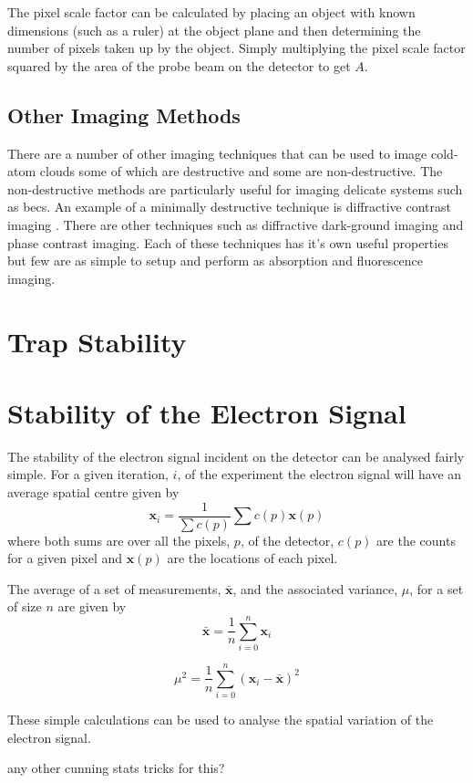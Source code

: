 The pixel scale factor can be calculated by placing an object with known dimensions (such as a ruler) at the object plane and then determining the number of pixels taken up by the object. Simply multiplying the pixel scale factor squared by the area of the probe beam on the detector to get $A$.

\subsection{Other Imaging Methods}

There are a number of other imaging techniques that can be used to image cold-atom clouds some of which are destructive and some are non-destructive. The non-destructive methods are particularly useful for imaging delicate systems such as \glspl{bec}. An example of a minimally destructive technique is diffractive contrast imaging \cite{sheludko_excited-state_2007}. There are other techniques such as diffractive dark-ground imaging\cite{gregory-orfeus_diffractive_2011} and phase contrast imaging\cite{andrews_propagation_1997}. Each of these techniques has it's own useful properties but few are as simple to setup and perform as absorption and fluorescence imaging.


\section{Trap Stability}

\section{Stability of the Electron Signal}

The stability of the electron signal incident on the detector can be analysed fairly simple. For a given iteration, $i$, of the experiment the electron signal will have an average spatial centre given by
\begin{equation}\label{eq:weight_average_spatial}
\boldsymbol{x}_i = \frac{1}{\sum c(p)} \sum c(p) \boldsymbol x(p)
\end{equation}
where both sums are over all the pixels, $p$, of the detector, $c(p)$ are the counts for a given pixel and $\boldsymbol x(p)$ are the locations of each pixel.

The average of a set of measurements, $\bar{\boldsymbol{x}}$, and the associated variance, $\mu$, for a set of size $n$ are given by
\begin{equation}\label{eq:average_spatial}
\bar{\boldsymbol{x}} = \frac{1}{n} \sum_{i=0}^{n} \boldsymbol{x}_i
\end{equation}

\begin{equation}\label{eq:variance}
\mu^2 = \frac{1}{n} \sum_{i=0}^{n} (\boldsymbol{x}_i - \bar{\boldsymbol{x}})^2
\end{equation}

These simple calculations can be used to analyse the spatial variation of the electron signal.

{\color{red} any other cunning stats tricks for this?}
